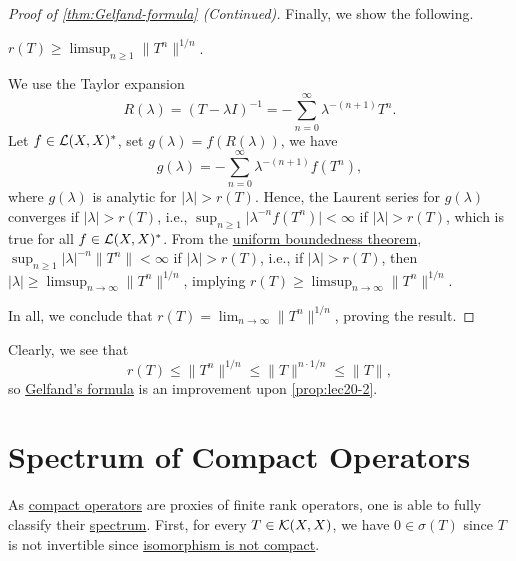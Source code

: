 \begin{proof}[Proof of \autoref{thm:Gelfand-formula} (Continued)]
	Finally, we show the following.
	\begin{claim}
		\(r(T) \geq \limsup_{n \geq 1} \lVert T^n \rVert ^{1 / n} \).
	\end{claim}
	\begin{explanation}
		We use the Taylor expansion
		\[
			R(\lambda ) = (T - \lambda I)^{-1} = - \sum_{n=0}^{\infty} \lambda ^{-(n+1)}T^n.
		\]
		Let \(f\in \mathcal{\MakeUppercase{l}} (X, X)^{\ast} \), set \(g(\lambda ) = f(R(\lambda ))\), we have
		\[
			g(\lambda ) = - \sum_{n=0}^{\infty} \lambda ^{-(n+1)} f(T^n),
		\]
		where \(g(\lambda )\) is analytic for \(\vert \lambda  \vert > r(T)\). Hence, the Laurent series for \(g(\lambda )\) converges if \(\vert \lambda  \vert > r(T)\), i.e., \(\sup _{n\geq 1} \vert \lambda ^{-n} f(T^n) \vert < \infty\) if \(\vert \lambda  \vert > r(T)\), which is true for all \(f\in \mathcal{\MakeUppercase{l}} (X, X)^{\ast} \). From the \hyperref[thm:uniform-boundedness]{uniform boundedness theorem}, \(\sup _{n\geq 1} \vert \lambda  \vert^{-n} \lVert T^n \rVert < \infty\) if \(\vert \lambda  \vert > r(T) \), i.e., if \(\vert \lambda  \vert > r(T) \), then \(\vert \lambda \vert \geq \limsup_{n \to \infty} \lVert T^n \rVert ^{1 / n}\), implying \(r(T) \geq \limsup_{n \to \infty} \lVert T^n \rVert ^{1 / n}\).
	\end{explanation}

	In all, we conclude that \(r(T) = \lim_{n \to \infty} \lVert T^n \rVert ^{1 / n}\), proving the result.
\end{proof}

Clearly, we see that
\[
	r(T) \leq \lVert T^n \rVert ^{1 / n} \leq \lVert T \rVert ^{n\cdot 1 / n} \leq \lVert T \rVert,
\]
so \hyperref[thm:Gelfand-formula]{Gelfand's formula} is an improvement upon \autoref{prop:lec20-2}.

\section{Spectrum of Compact Operators}
As \hyperref[def:compact-op]{compact operators} are proxies of finite rank operators, one is able to fully classify their \hyperref[def:spectrum-point]{spectrum}. First, for every \(T\in \mathcal{\MakeUppercase{k}} (X, X)\), we have \(0\in \sigma (T)\) since \(T\) is not invertible since \hyperref[col:iso-are-not-compact]{isomorphism is not compact}.

